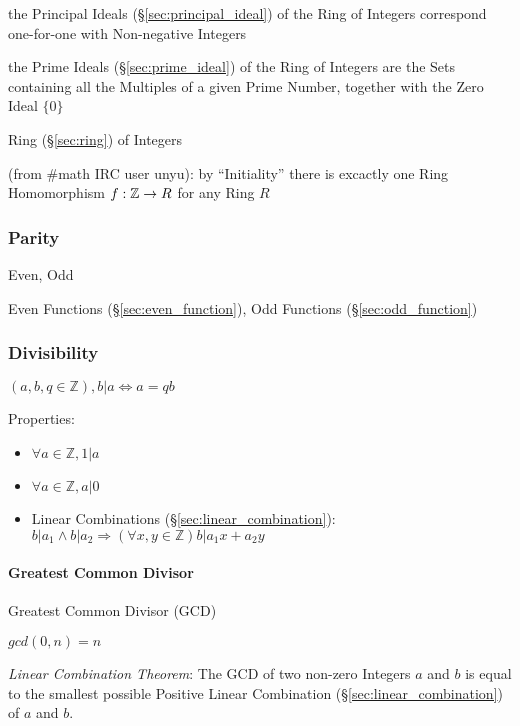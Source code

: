 the Principal Ideals (\S\ref{sec:principal_ideal}) of the Ring of Integers
correspond one-for-one with Non-negative Integers

the Prime Ideals (\S\ref{sec:prime_ideal}) of the Ring of Integers are the Sets
containing all the Multiples of a given Prime Number, together with the Zero
Ideal $\{0\}$

Ring (\S\ref{sec:ring}) of Integers

(from #math IRC user unyu): by ``Initiality'' there is excactly one Ring
Homomorphism $f : \mathbb{Z} \rightarrow R$ for any Ring $R$



\subsubsection{Parity}\label{sec:parity}

Even, Odd

\fist Even Functions (\S\ref{sec:even_function}), Odd Functions
(\S\ref{sec:odd_function})



\subsubsection{Divisibility}\label{sec:divisibility}

$(a,b,q \in \mathbb{Z}), b|a \Leftrightarrow a = qb$

Properties:

\begin{itemize}
\item $\forall a \in \mathbb{Z}, 1|a$
\item $\forall a \in \mathbb{Z}, a|0$
\item Linear Combinations (\S\ref{sec:linear_combination}): $b|a_1
  \wedge b|a_2 \Rightarrow (\forall x,y \in \mathbb{Z})b|a_1 x + a_2
  y$
\end{itemize}



\paragraph{Greatest Common Divisor}\label{sec:gcd}\hfill

Greatest Common Divisor (GCD)

$gcd(0,n) = n$

\emph{Linear Combination Theorem}: The GCD of two non-zero Integers
$a$ and $b$ is equal to the smallest possible Positive Linear
Combination (\S\ref{sec:linear_combination}) of $a$ and $b$.

